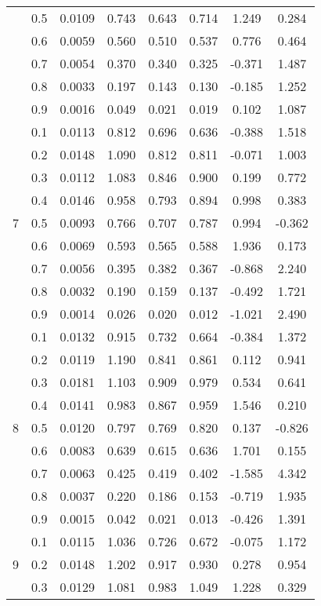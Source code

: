 \documentclass[11pt,a4paper]{report}
\begin{document}
\begin{longtable}{ | c | c || c | c | c | c | c | c | }
 & 0.5 & 0.0109 & 0.743 & 0.643 & 0.714 & 1.249 & 0.284 \\
 & 0.6 & 0.0059 & 0.560 & 0.510 & 0.537 & 0.776 & 0.464 \\
 & 0.7 & 0.0054 & 0.370 & 0.340 & 0.325 & -0.371 & 1.487 \\
 & 0.8 & 0.0033 & 0.197 & 0.143 & 0.130 & -0.185 & 1.252 \\
 & 0.9 & 0.0016 & 0.049 & 0.021 & 0.019 & 0.102 & 1.087 \\
 \hline
\multirow{9}{*}{7} & 0.1 & 0.0113 & 0.812 & 0.696 & 0.636 & -0.388 & 1.518 \\
 & 0.2 & 0.0148 & 1.090 & 0.812 & 0.811 & -0.071 & 1.003 \\
 & 0.3 & 0.0112 & 1.083 & 0.846 & 0.900 & 0.199 & 0.772 \\
 & 0.4 & 0.0146 & 0.958 & 0.793 & 0.894 & 0.998 & 0.383 \\
 & 0.5 & 0.0093 & 0.766 & 0.707 & 0.787 & 0.994 & -0.362 \\
 & 0.6 & 0.0069 & 0.593 & 0.565 & 0.588 & 1.936 & 0.173 \\
 & 0.7 & 0.0056 & 0.395 & 0.382 & 0.367 & -0.868 & 2.240 \\
 & 0.8 & 0.0032 & 0.190 & 0.159 & 0.137 & -0.492 & 1.721 \\
 & 0.9 & 0.0014 & 0.026 & 0.020 & 0.012 & -1.021 & 2.490 \\
 \hline
\multirow{9}{*}{8} & 0.1 & 0.0132 & 0.915 & 0.732 & 0.664 & -0.384 & 1.372 \\
 & 0.2 & 0.0119 & 1.190 & 0.841 & 0.861 & 0.112 & 0.941 \\
 & 0.3 & 0.0181 & 1.103 & 0.909 & 0.979 & 0.534 & 0.641 \\
 & 0.4 & 0.0141 & 0.983 & 0.867 & 0.959 & 1.546 & 0.210 \\
 & 0.5 & 0.0120 & 0.797 & 0.769 & 0.820 & 0.137 & -0.826 \\
 & 0.6 & 0.0083 & 0.639 & 0.615 & 0.636 & 1.701 & 0.155 \\
 & 0.7 & 0.0063 & 0.425 & 0.419 & 0.402 & -1.585 & 4.342 \\
 & 0.8 & 0.0037 & 0.220 & 0.186 & 0.153 & -0.719 & 1.935 \\
 & 0.9 & 0.0015 & 0.042 & 0.021 & 0.013 & -0.426 & 1.391 \\
 \hline
\multirow{9}{*}{9} & 0.1 & 0.0115 & 1.036 & 0.726 & 0.672 & -0.075 & 1.172 \\
 & 0.2 & 0.0148 & 1.202 & 0.917 & 0.930 & 0.278 & 0.954 \\
 & 0.3 & 0.0129 & 1.081 & 0.983 & 1.049 & 1.228 & 0.329 \\

\end{longtable}
\end{document}
